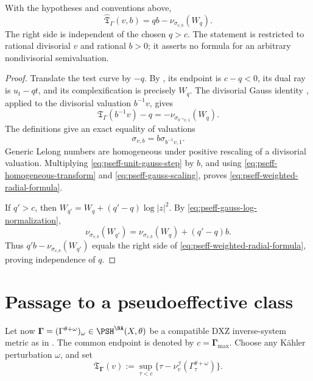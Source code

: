 \begin{proposition}\label{prop:pseff-weighted-radial-formula}
With the hypotheses and conventions above,
\[
 \widehat{\mathfrak T}_\Gamma(v,b)
 =qb-\nu_{\sigma_{v,b}}(W_q).
\tag{71.24}\label{eq:pseff-weighted-radial-formula}
\]
The right side is independent of the chosen \(q>c\).
The statement is restricted to rational divisorial \(v\) and rational
\(b>0\); it asserts no formula for an arbitrary nondivisorial
semivaluation.
\end{proposition}

\begin{proof}
Translate the test curve by \(-q\).  By
, its endpoint is \(c-q<0\), its
dual ray is \(u_t-qt\), and its complexification is precisely \(W_q\).
The divisorial Gauss identity \cite[Proposition~3.1]{DXZ23}, applied to
the divisorial valuation
\(b^{-1}v\), gives
\[
 \mathfrak T_\Gamma(b^{-1}v)-q
 =-\nu_{\sigma_{b^{-1}v,1}}(W_q).
\tag{71.25}\label{eq:pseff-unit-gauss-step}
\]
The definitions give an exact equality of valuations
\[
                 \sigma_{v,b}=b\sigma_{b^{-1}v,1}.
\tag{71.26}\label{eq:pseff-gauss-scaling}
\]
Generic Lelong numbers are homogeneous under positive rescaling of a
divisorial valuation.  Multiplying \eqref{eq:pseff-unit-gauss-step} by
\(b\), and using \eqref{eq:pseff-homogeneous-transform} and
\eqref{eq:pseff-gauss-scaling}, proves
\eqref{eq:pseff-weighted-radial-formula}.

If \(q'>c\), then
\(W_{q'}=W_q+(q'-q)\log|z|^2\).  By
\eqref{eq:pseff-gauss-log-normalization},
\[
 \nu_{\sigma_{v,b}}(W_{q'})
 =\nu_{\sigma_{v,b}}(W_q)+(q'-q)b.
\]
Thus \(q'b-\nu_{\sigma_{v,b}}(W_{q'})\) equals the right side of
\eqref{eq:pseff-weighted-radial-formula}, proving independence of \(q\).
\end{proof}

\section{Passage to a pseudoeffective class}

Let now
\(\boldsymbol\Gamma=(\Gamma^{\theta+\omega})_\omega\in
\PSH^{\NA}(X,\theta)\) be a compatible DXZ inverse-system metric as in
.  The common endpoint is denoted by
\(c=\boldsymbol\Gamma_{\max}\).  Choose any K\"ahler perturbation
\(\omega\), and set
\[
 \mathfrak T_{\boldsymbol\Gamma}(v)
 :=\sup_{\tau<c}
   \{\tau-\nu_v^{\mathcal I}
       (\Gamma^{\theta+\omega}_\tau)\}.
\tag{71.27}\label{eq:pseff-inverse-system-transform}
\]

